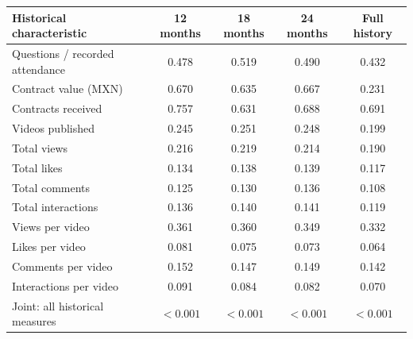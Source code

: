 \begingroup\small
\setlength{\tabcolsep}{3pt}
\renewcommand{\arraystretch}{1.25}
\noindent%
\begin{tabular*}{\linewidth}{@{\extracolsep{\fill}}lcccc@{}}
\toprule
Historical characteristic & 12 months & 18 months & 24 months & Full history \\
\midrule
Questions / recorded attendance & 0.478 & 0.519 & 0.490 & 0.432 \\
\addlinespace
Contract value (MXN) & 0.670 & 0.635 & 0.667 & 0.231 \\
Contracts received & 0.757 & 0.631 & 0.688 & 0.691 \\
\addlinespace
Videos published & 0.245 & 0.251 & 0.248 & 0.199 \\
Total views & 0.216 & 0.219 & 0.214 & 0.190 \\
Total likes & 0.134 & 0.138 & 0.139 & 0.117 \\
Total comments & 0.125 & 0.130 & 0.136 & 0.108 \\
Total interactions & 0.136 & 0.140 & 0.141 & 0.119 \\
Views per video & 0.361 & 0.360 & 0.349 & 0.332 \\
Likes per video & 0.081 & 0.075 & 0.073 & 0.064 \\
Comments per video & 0.152 & 0.147 & 0.149 & 0.142 \\
Interactions per video & 0.091 & 0.084 & 0.082 & 0.070 \\
\midrule
Joint: all historical measures & $<0.001$ & $<0.001$ & $<0.001$ & $<0.001$ \\
\bottomrule
\end{tabular*}\par\endgroup
